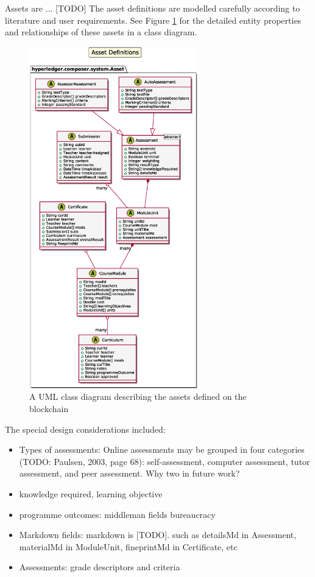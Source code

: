 Assets are ... [TODO]
The asset definitions are modelled carefully according to literature and user requirements.
See Figure \ref{fig:assets} for the detailed entity properties and relationships of these assets 
in a class diagram.

\begin{figure}[!ht] 
    \centering    
    \includegraphics[width=0.65\textwidth]{assets}
    \caption[Assets Class Diagram]
        {A UML class diagram describing the assets defined on the blockchain} 
    \label{fig:assets}
\end{figure}

The special design considerations included:
\begin{itemize}
    \setlength\itemsep{0em}            
    \item Types of assessments: Online assessments may be grouped in four categories (TODO: Paulsen, 2003, page 68): 
    self-assessment, computer assessment, tutor assessment, and peer assessment. Why two in future work?
    \item knowledge required, learning objective
    \item programme outcomes: middleman fields bureaucracy
    \item Markdown fields: markdown is [TODO]. such as detailsMd in Assessment, materialMd in ModuleUnit, 
    fineprintMd in Certificate, etc
    \item Assessments: grade descriptors and criteria
\end{itemize}

